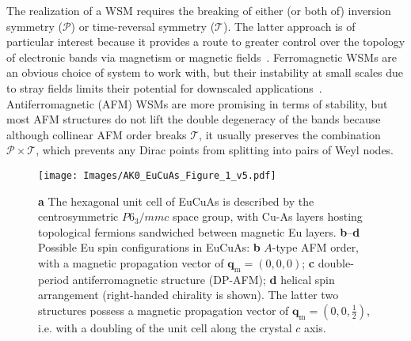 \documentclass[aps,prl,amsmath,amssymb,amstext,citeautoscript,punctuation,nofootinbib,superscriptaddress,twocolumn]{revtex4-1}
\newcommand{\eca}{EuCuAs}
\begin{document}
The realization of a WSM requires the breaking of either (or both of) inversion symmetry ($\mathcal{P}$) or time-reversal symmetry ($\mathcal{T}$). The latter approach is of particular interest because it provides a route to greater control over the topology of electronic bands via magnetism or magnetic fields~\cite{Bernevig_2022_review,Tokura2019}. Ferromagnetic WSMs are an obvious choice of system to work with, but their instability at small scales due to stray fields limits their potential for downscaled applications~\cite{Liu_2018_CSS,Destraz_2020_PrAlGe,Kim_2018_FGT,Ilya_2019_CMG}. Antiferromagnetic (AFM) WSMs are more promising in terms of stability, but most AFM structures do not lift the double degeneracy of the bands because although collinear AFM order
 breaks $\mathcal{T}$, it usually preserves the combination $\mathcal{P}\times \mathcal{T}$, which prevents any Dirac points from splitting into pairs of Weyl nodes. 

\begin{figure}[b!]
\texttt{[image: Images/AK0\_EuCuAs\_Figure\_1\_v5.pdf]}
\caption{\label{fig:Figure_1} \textbf{a} The hexagonal unit cell of \eca{} is described by the centrosymmetric $P6_3/mmc$ space group, with Cu-As layers hosting topological fermions sandwiched between magnetic Eu layers. \textbf{b}--\textbf{d} Possible Eu spin configurations in EuCuAs: \textbf{b} $A$-type AFM order, with a magnetic propagation vector of $\textbf{q}_\textrm{m}=(0,0,0)$; \textbf{c} double-period antiferromagnetic structure (DP-AFM); \textbf{d} helical spin arrangement (right-handed chirality is shown). The latter two structures possess a magnetic propagation vector of $\textbf{q}_\textrm{m} = (0,0,\frac{1}{2})$, i.e. with a doubling of the unit cell along the crystal $c$ axis.}
\end{figure}
\end{document}
